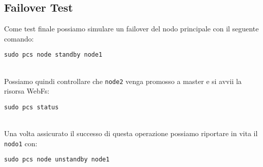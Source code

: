 \subsection{Failover Test}

Come test finale possiamo simulare un failover del nodo principale con il seguente comando:

\begin{lstlisting}[style=cmd]
 sudo pcs node standby node1
\end{lstlisting}
\ \\
Possiamo quindi controllare che \lstinline[style=cmd]|node2| venga promosso a master e si avvii la risorsa WebFs:

\begin{lstlisting}[style=cmd]
 sudo pcs status
\end{lstlisting}
\ \\
Una volta assicurato il successo di questa operazione possiamo riportare in vita il \lstinline[style=cmd]|nodo1| con:

\begin{lstlisting}[style=cmd]
 sudo pcs node unstandby node1
\end{lstlisting}